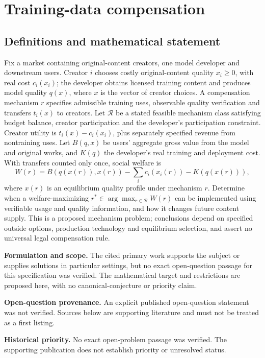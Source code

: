 \documentclass[11pt]{article}
\begin{document}
\section*{Training-data compensation}\label{30007697}
\subsection{Definitions and mathematical statement}
Fix a market containing original-content creators, one model developer and downstream users. Creator \(i\) chooses costly original-content quality \(x_i\geq0\), with real cost \(c_i(x_i)\); the developer obtains licensed training content and produces model quality \(q(x)\), where \(x\) is the vector of creator choices. A compensation mechanism \(r\) specifies admissible training uses, observable quality verification and transfers \(t_i(x)\) to creators. Let \(\mathcal R\) be a stated feasible mechanism class satisfying budget balance, creator participation and the developer's participation constraint. Creator utility is \(t_i(x)-c_i(x_i)\), plus separately specified revenue from nontraining uses. Let \(B(q,x)\) be users' aggregate gross value from the model and original works, and \(K(q)\) the developer's real training and deployment cost. With transfers counted only once, social welfare is
\[
W(r)=B(q(x(r)),x(r))-\sum_i c_i(x_i(r))-K(q(x(r))),
\]
where \(x(r)\) is an equilibrium quality profile under mechanism \(r\). Determine when a welfare-maximizing \(r^\ast\in\arg\max_{r\in\mathcal R}W(r)\) can be implemented using verifiable usage and quality information, and how it changes future content supply. This is a proposed mechanism problem; conclusions depend on specified outside options, production technology and equilibrium selection, and assert no universal legal compensation rule.

\par\textbf{Formulation and scope.} The cited primary work supports the subject or supplies solutions in particular settings, but no exact open-question passage for this specification was verified. The mathematical target and restrictions are proposed here, with no canonical-conjecture or priority claim.

\par\textbf{Open-question provenance.} An explicit published open-question statement was not verified. Sources below are supporting literature and must not be treated as a first listing.

\par\textbf{Historical priority.} No exact open-problem passage was verified. The supporting publication does not establish priority or unresolved status.
\end{document}
